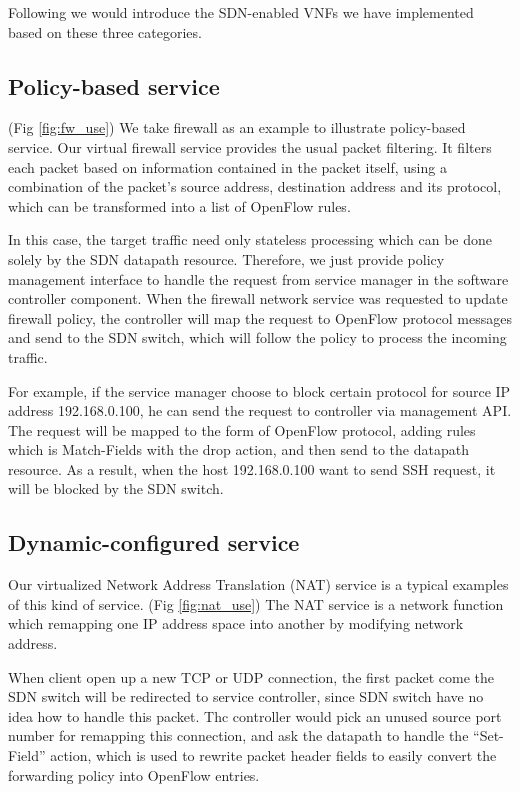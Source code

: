 Following we would introduce the SDN-enabled VNFs we have implemented based on these three categories.

\subsection{Policy-based service}
(Fig \ref{fig:fw_use})
We take firewall as an example to illustrate policy-based service. Our virtual firewall service provides the usual packet filtering. It filters each packet based on information contained in the packet itself, using a combination of the packet's source address, destination address and its protocol, which can be transformed into a list of OpenFlow rules.

In this case, the target traffic need only stateless processing which can be done solely by the SDN datapath resource. Therefore, we just provide policy management interface to handle the request from service manager in the software controller component. When the firewall network service was requested to update firewall policy, the controller will map the request to OpenFlow protocol messages and send to the SDN switch, which will follow the policy to process the incoming traffic.

For example, if the service manager choose to block certain protocol for source IP address 192.168.0.100, he can send the request to controller via management API. The request will be mapped to the form of OpenFlow protocol, adding rules which is Match-Fields with the drop action, and then send to the datapath resource. As a result, when the host 192.168.0.100 want to send SSH request, it will be blocked by the SDN switch.

\subsection{Dynamic-configured service}
Our virtualized Network Address Translation (NAT) service is a typical examples of this kind of service. (Fig \ref{fig:nat_use}) The NAT service is a network function which remapping one IP address space into another by modifying network address.

When client open up a new TCP or UDP connection, the first packet come the SDN switch will be redirected to service controller, since SDN switch have no idea how to handle this packet. Thc controller would pick an unused source port number for remapping this connection, and ask the datapath to handle the “Set-Field” action, which is used to rewrite packet header fields to
easily convert the forwarding policy into OpenFlow entries.

